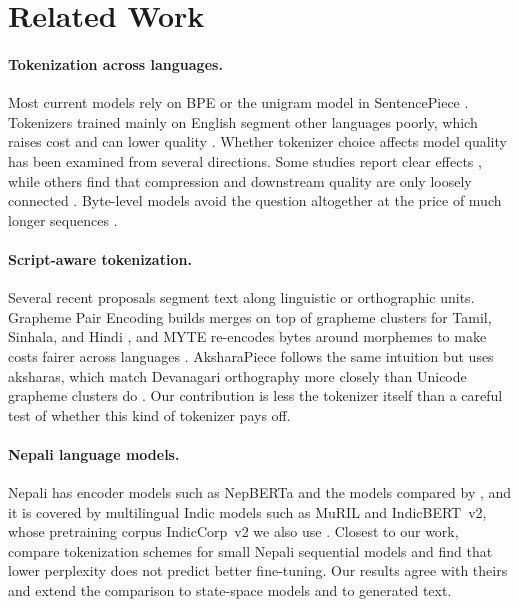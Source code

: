 \documentclass[11pt]{article}
\newcommand{\ap}{AksharaPiece}
\begin{document}
\section{Related Work}

\paragraph{Tokenization across languages.}
Most current models rely on BPE \citep{sennrich-etal-2016-neural} or the unigram model in SentencePiece \citep{kudo-2018-subword,kudo-richardson-2018-sentencepiece}. Tokenizers trained mainly on English segment other languages poorly, which raises cost and can lower quality \citep{rust-etal-2021-good,petrov2023tokenizers,ahia-etal-2023-languages}. Whether tokenizer choice affects model quality has been examined from several directions. Some studies report clear effects \citep{bostrom-durrett-2020-byte,toraman2023impact}, while others find that compression and downstream quality are only loosely connected \citep{zouhar-etal-2023-tokenization,schmidt-etal-2024-tokenization,ali-etal-2024-tokenizer}. Byte-level models avoid the question altogether at the price of much longer sequences \citep{xue-etal-2022-byt5}.

\paragraph{Script-aware tokenization.}
Several recent proposals segment text along linguistic or orthographic units. Grapheme Pair Encoding builds merges on top of grapheme clusters for Tamil, Sinhala, and Hindi \citep{velayuthan-sarveswaran-2025-egalitarian}, and MYTE re-encodes bytes around morphemes to make costs fairer across languages \citep{limisiewicz-etal-2024-myte}. \ap{} follows the same intuition but uses aksharas, which match Devanagari orthography more closely than Unicode grapheme clusters do \citep{unicode15}. Our contribution is less the tokenizer itself than a careful test of whether this kind of tokenizer pays off.

\paragraph{Nepali language models.}
Nepali has encoder models such as NepBERTa \citep{timilsina-etal-2022-nepberta} and the models compared by \citet{maskey-etal-2022-nepali}, and it is covered by multilingual Indic models such as MuRIL \citep{khanuja2021muril} and IndicBERT~v2, whose pretraining corpus IndicCorp~v2 we also use \citep{doddapaneni-etal-2023-towards}. Closest to our work, \citet{luitel-etal-2025-perplexity} compare tokenization schemes for small Nepali sequential models and find that lower perplexity does not predict better fine-tuning. Our results agree with theirs and extend the comparison to state-space models and to generated text.
\end{document}
